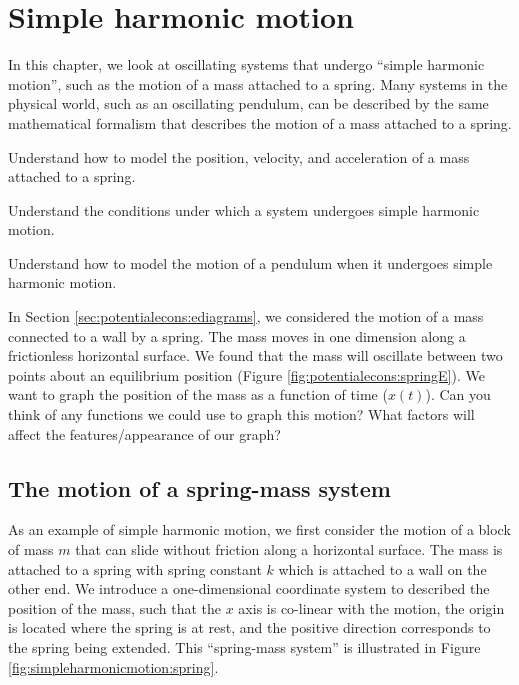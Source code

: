 
\chapter{Simple harmonic motion}
\label{chapter:simpleharmonicmotion}
In this chapter, we look at oscillating systems that undergo ``simple harmonic motion'', such as the motion of a mass attached to a spring. Many systems in the physical world, such as an oscillating pendulum, can be described by the same mathematical formalism that describes the motion of a mass attached to a spring. 

\begin{learningObjectives}{
 \item Understand how to model the position, velocity, and acceleration of a mass attached to a spring.
 \item Understand the conditions under which a system undergoes simple harmonic motion.
 \item Understand how to model the motion of a pendulum when it undergoes simple harmonic motion.
 }
\end{learningObjectives}

\begin{opening}
In Section \ref{sec:potentialecons:ediagrams}, we considered the motion of a mass connected to a wall by a spring. The mass moves in one dimension along a frictionless horizontal surface. We found that the mass will oscillate between two points about an equilibrium position (Figure \ref{fig:potentialecons:springE}). We want to graph the position of the mass as a function of time ($x(t)$). Can you think of any functions we could use to graph this motion? What factors will affect the features/appearance of our graph?
\end{opening}

\section{The motion of a spring-mass system}
As an example of simple harmonic motion, we first consider the motion of a block of mass $m$ that can slide without friction along a horizontal surface. The mass is attached to a spring with spring constant $k$ which is attached to a wall on the other end. We introduce a one-dimensional coordinate system to described the position of the mass, such that the $x$ axis is co-linear with the motion, the origin is located where the spring is at rest, and the positive direction corresponds to the spring being extended. This ``spring-mass system'' is illustrated in Figure \ref{fig:simpleharmonicmotion:spring}.

